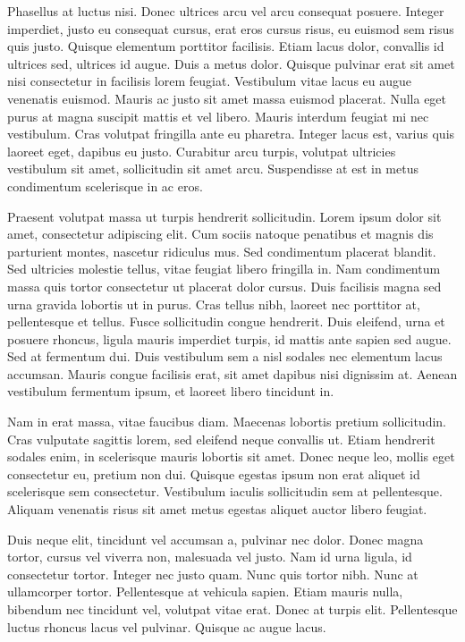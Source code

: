 Phasellus at luctus nisi. Donec ultrices arcu vel arcu consequat
posuere. Integer imperdiet, justo eu consequat cursus, erat eros
cursus risus, eu euismod sem risus quis justo. Quisque elementum
porttitor facilisis. Etiam lacus dolor, convallis id ultrices sed,
ultrices id augue. Duis a metus dolor. Quisque pulvinar erat sit amet
nisi consectetur in facilisis lorem feugiat. Vestibulum vitae lacus eu
augue venenatis euismod. Mauris ac justo sit amet massa euismod
placerat. Nulla eget purus at magna suscipit mattis et vel
libero. Mauris interdum feugiat mi nec vestibulum. Cras volutpat
fringilla ante eu pharetra. Integer lacus est, varius quis laoreet
eget, dapibus eu justo. Curabitur arcu turpis, volutpat ultricies
vestibulum sit amet, sollicitudin sit amet arcu. Suspendisse at est in
metus condimentum scelerisque in ac eros.

Praesent volutpat massa ut turpis hendrerit sollicitudin. Lorem ipsum
dolor sit amet, consectetur adipiscing elit. Cum sociis natoque
penatibus et magnis dis parturient montes, nascetur ridiculus mus. Sed
condimentum placerat blandit. Sed ultricies molestie tellus, vitae
feugiat libero fringilla in. Nam condimentum massa quis tortor
consectetur ut placerat dolor cursus. Duis facilisis magna sed urna
gravida lobortis ut in purus. Cras tellus nibh, laoreet nec porttitor
at, pellentesque et tellus. Fusce sollicitudin congue hendrerit. Duis
eleifend, urna et posuere rhoncus, ligula mauris imperdiet turpis, id
mattis ante sapien sed augue. Sed at fermentum dui. Duis vestibulum
sem a nisl sodales nec elementum lacus accumsan. Mauris congue
facilisis erat, sit amet dapibus nisi dignissim at. Aenean vestibulum
fermentum ipsum, et laoreet libero tincidunt in.

Nam in erat massa, vitae faucibus diam. Maecenas lobortis pretium
sollicitudin. Cras vulputate sagittis lorem, sed eleifend neque
convallis ut. Etiam hendrerit sodales enim, in scelerisque mauris
lobortis sit amet. Donec neque leo, mollis eget consectetur eu,
pretium non dui. Quisque egestas ipsum non erat aliquet id scelerisque
sem consectetur. Vestibulum iaculis sollicitudin sem at
pellentesque. Aliquam venenatis risus sit amet metus egestas aliquet
auctor libero feugiat.

Duis neque elit, tincidunt vel accumsan a, pulvinar nec dolor. Donec
magna tortor, cursus vel viverra non, malesuada vel justo. Nam id urna
ligula, id consectetur tortor. Integer nec justo quam. Nunc quis
tortor nibh. Nunc at ullamcorper tortor. Pellentesque at vehicula
sapien. Etiam mauris nulla, bibendum nec tincidunt vel, volutpat vitae
erat. Donec at turpis elit. Pellentesque luctus rhoncus lacus vel
pulvinar. Quisque ac augue lacus.
